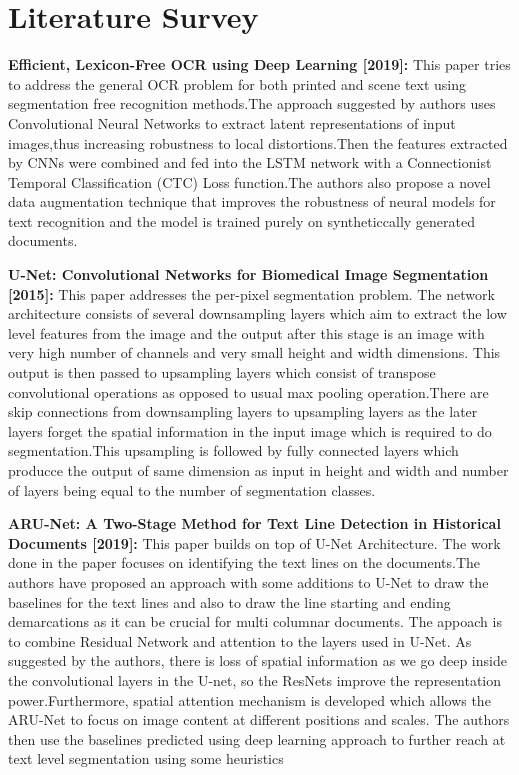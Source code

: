 %
{\let\clearpage\relax \chapter{Literature Survey}}

\textbf{Efficient, Lexicon-Free OCR using Deep Learning [2019]\cite{1}:}
This paper tries to address the general OCR problem for both printed and scene text using segmentation free recognition methods.The approach suggested by authors uses Convolutional Neural Networks to extract latent representations of input images,thus increasing robustness to local distortions.Then the features extracted by
CNNs were combined and fed into the LSTM network with a Connectionist Temporal Classification (CTC) Loss function.The authors also propose a novel data augmentation technique that improves the robustness of neural models for text recognition and the model is trained purely on syntheticcally generated documents.

\textbf{U-Net: Convolutional Networks for Biomedical Image Segmentation [2015]\cite{2}:}
This paper addresses the per-pixel segmentation problem. The network architecture consists of several downsampling layers which aim to extract the low level features from the image and the output after this stage is an image with very high number of channels and very small height and width dimensions. This output is then passed to upsampling layers which consist of transpose convolutional operations as opposed to usual max pooling operation.There are skip connections from downsampling layers to upsampling layers as the later layers forget the spatial information in the input image which is required to do segmentation.This upsampling is followed by fully connected layers which producce the output of same dimension as input in height and width and number of layers being equal to the number of segmentation classes.

\textbf{ARU-Net: A Two-Stage Method for Text Line Detection in Historical Documents [2019]\cite{3}:}
This paper builds on top of U-Net Architecture. The work done in the paper focuses on identifying the text lines on the documents.The authors have proposed an approach with some additions to U-Net to draw the baselines for the text lines and also to draw the line starting and ending demarcations as it can be crucial for multi columnar documents. The appoach is to combine Residual Network\cite{4} and attention to the layers used in U-Net. As suggested by the authors, there is loss of spatial information as we go deep inside the convolutional layers in the U-net, so the ResNets improve the representation power.Furthermore, spatial attention mechanism is developed which allows the ARU-Net to focus on image content at different positions and scales. The authors then use the baselines predicted using deep learning approach to further reach at text level segmentation using some heuristics


